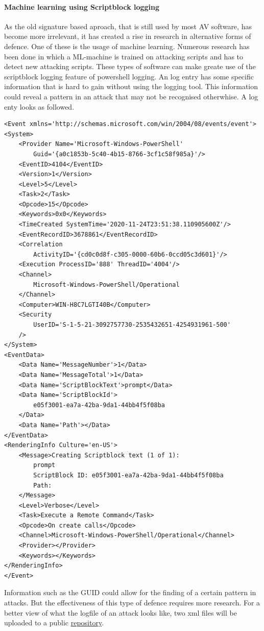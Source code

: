 \documentclass{article}%
\begin{document}
\paragraph{Machine learning using Scriptblock logging}\hfill
\newline
As the old signature based aproach, that is still used by most AV software, has become more irrelevant, it has created a rise in research in alternative forms of defence. One of these is the usage of machine learning. Numerous research has been done in which a ML-machine is trained on attacking scripts and has to detect new attacking scripts. These types of software can make greate use of the scriptblock logging feature of powershell logging. An log entry has some specific information that is hard to gain without using the logging tool. This information could reveal a pattern in an attack that may not be recognised otherwhise. A log enty looks as followed.
\begin{lstlisting}
<Event xmlns='http://schemas.microsoft.com/win/2004/08/events/event'>
<System>
	<Provider Name='Microsoft-Windows-PowerShell'
		Guid='{a0c1853b-5c40-4b15-8766-3cf1c58f985a}'/>
	<EventID>4104</EventID>
	<Version>1</Version>
	<Level>5</Level>
	<Task>2</Task>
	<Opcode>15</Opcode>
	<Keywords>0x0</Keywords>
	<TimeCreated SystemTime='2020-11-24T23:51:38.110905600Z'/>
	<EventRecordID>3678861</EventRecordID>
	<Correlation 
		ActivityID='{cd0c0d8f-c305-0000-60b6-0ccd05c3d601}'/>
	<Execution ProcessID='888' ThreadID='4004'/>
	<Channel>
		Microsoft-Windows-PowerShell/Operational
	</Channel>
	<Computer>WIN-H8C7LGTI40B</Computer>
	<Security 
		UserID='S-1-5-21-3092757730-2535432651-4254931961-500'
	/>
</System>
<EventData>
	<Data Name='MessageNumber'>1</Data>
	<Data Name='MessageTotal'>1</Data>
	<Data Name='ScriptBlockText'>prompt</Data>
	<Data Name='ScriptBlockId'>
		e05f3001-ea7a-42ba-9da1-44bb4f5f08ba
	</Data>
	<Data Name='Path'></Data>
</EventData>
<RenderingInfo Culture='en-US'>
	<Message>Creating Scriptblock text (1 of 1):
		prompt
		ScriptBlock ID: e05f3001-ea7a-42ba-9da1-44bb4f5f08ba
		Path: 
	</Message>
	<Level>Verbose</Level>
	<Task>Execute a Remote Command</Task>
	<Opcode>On create calls</Opcode>
	<Channel>Microsoft-Windows-PowerShell/Operational</Channel>
	<Provider></Provider>
	<Keywords></Keywords>
</RenderingInfo>
</Event>
\end{lstlisting}
Information such as the GUID could allow for the finding of a certain pattern in attacks. But the effectiveness of this type of defence requires more research. For a better view of what the logfile of an attack looks like, two xml files will be uploaded to a public \href{https://github.com/ZamirAmiri/Obfuscation}{repository}.
\end{document}
